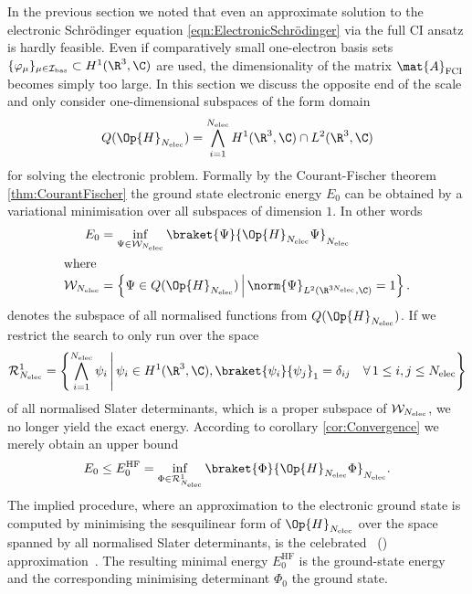 In the previous section we noted that even an approximate
solution to the electronic Schrödinger equation \eqref{eqn:ElectronicSchrödinger}
via the full CI ansatz
is hardly feasible.
Even if comparatively small one-electron basis sets
$\{ \varphi_\mu \}_{\mu\in\Ibas} \subset H^1(\R^3,\C)$
are used,
the dimensionality
of the matrix $\mat{A}_\text{FCI}$ becomes simply too large.
In this section we discuss the opposite end of the scale and
only consider one-dimensional subspaces of the form domain
\[ Q(\Op{H}_{\Nelec}) = \bigwedge_{i=1}^{\Nelec} H^1(\R^3, \C) \cap L^2(\R^3, \C) \]
for solving the electronic problem.
Formally by the Courant-Fischer theorem \eqref{thm:CourantFischer}
the ground state electronic energy $E_0$ can be obtained by
a variational minimisation over all subspaces of dimension $1$.
In other words
\begin{align}
	\label{eqn:GroundStateVariational}
	E_0 &= \inf_{\Psi \in \mathcal{W}_{\Nelec}} \braket{\Psi}{\Op{H}_{\Nelec} \Psi}_{\Nelec} \\
\intertext{where}
	\label{eqn:NormalisedFormDomain}
	\mathcal{W}_{\Nelec} &= \left\{ \Psi \in Q(\Op{H}_{\Nelec})
	\, \middle| \,
	\norm{\Psi}_{L^2(\R^{3 \Nelec}, \C)} = 1 \right\}.
\end{align}
denotes the subspace of all normalised functions from $Q(\Op{H}_{\Nelec})$.
If we restrict the search to only run over the space
\begin{equation}
	\mathcal{R}^1_{\Nelec} = \left\{ \bigwedge_{i=1}^{\Nelec} \psi_i
	\, \middle| \,
	\psi_i \in H^1(\R^3, \C),
	\braket{\psi_i}{\psi_j}_1 = \delta_{ij}
	\quad \forall \, 1\leq i,j\leq \Nelec
	\right\}
	\label{eqn:RankOneSubspace}
\end{equation}
of all normalised Slater determinants,
which is a proper subspace of $\mathcal{W}_{N_\text{elec}}$,
we no longer yield the exact energy.
According to corollary \vref{cor:Convergence} we merely obtain an upper bound
\begin{equation}
	E_0 \leq E_0^\text{HF} = \inf_{\Phi \in \mathcal{R}^1_{\Nelec}}
	\braket{\Phi}{\Op{H}_{\Nelec} \Phi}_{\Nelec}.
	\label{eqn:HFDeterminant}
\end{equation}
The implied procedure,
where an approximation to the electronic ground state
is computed by minimising the sesquilinear form of $\Op{H}_{\Nelec}$
over the space spanned by all normalised Slater determinants,
is the celebrated ~(\HF) approximation~\cite{Fock1930}.
The resulting minimal energy $E_0^\text{HF}$
is the \HF ground-state energy
and the corresponding minimising determinant
$\Phi_0$ the \HF ground state.

